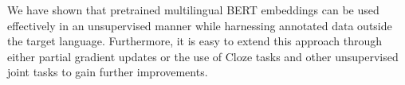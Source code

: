 \documentclass[letterpaper]{article} \usepackage{aaai20}  \usepackage{times}  \usepackage{helvet} \usepackage{courier}  \usepackage[hyphens]{url}  \usepackage{graphicx} \urlstyle{rm} \def\UrlFont{\rm}  \usepackage{graphicx}  \frenchspacing  \setlength{\pdfpagewidth}{8.5in}  \setlength{\pdfpageheight}{11in}  \usepackage{amsmath}
\begin{document}
We have shown that pretrained multilingual BERT embeddings can be used effectively in an unsupervised manner while harnessing annotated data outside the target language. Furthermore, it is easy to extend this approach through either partial gradient updates or the use of Cloze tasks and other unsupervised joint tasks to gain further improvements.











 


\end{document}
